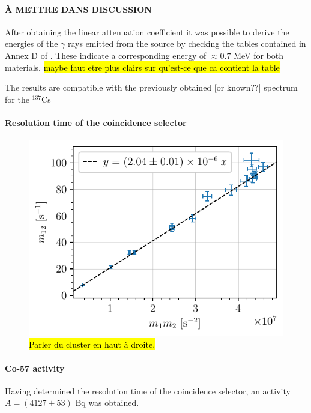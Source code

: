 \paragraph{À METTRE DANS DISCUSSION}
After obtaining the linear attenuation coefficient it was possible to derive the energies of the $\gamma$ rays emitted from the source by checking the tables contained in Annex D of \cite{notice_generale}.
These indicate a corresponding energy of $\approx 0.7$ MeV for both materials.
\hl{maybe faut etre plus clairs sur qu'est-ce que ca contient la table}

The results are compatible with the previously obtained [or known??] spectrum for the $^{137}$Cs

\paragraph{Resolution time of the coincidence selector}
\begin{figure}[htbp]
    \centering
    \includegraphics[scale=1]{figures/twotheta_cs137.pdf}
    \caption{\hl{Parler du cluster en haut à droite.}}
    \label{fig:twotheta_cs137}
\end{figure}

\paragraph{Co-57 activity}
Having determined the resolution time of the coincidence selector, an activity $A= (4127 \pm 53)$ Bq was obtained.